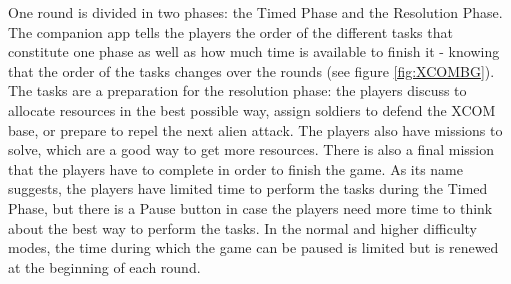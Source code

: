 One round is divided in two phases: the Timed Phase and the Resolution Phase. The companion app tells the players the order of the different tasks that constitute one phase as well as how much time is available to finish it - knowing that the order of the tasks changes over the rounds (see figure \ref{fig:XCOMBG}). The tasks are a preparation for the resolution phase: the players discuss to allocate resources in the best possible way, assign soldiers to defend the XCOM base, or prepare to repel the next alien attack. The players also have missions to solve, which are a good way to get more resources. There is also a final mission that the players have to complete in order to finish the game. As its name suggests, the players have limited time to perform the tasks during the Timed Phase, but there is a Pause button in case the players need more time to think about the best way to perform the tasks. In the normal and higher difficulty modes, the time during which the game can be paused is limited but is renewed at the beginning of each round.

